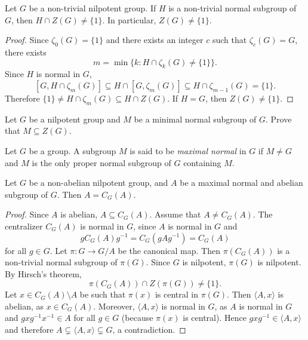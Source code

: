 \begin{theorem}[Hirsch]
\label{thm:Hirsch}
Let $G$ be a non-trivial nilpotent group. If $H$ is a non-trivial normal subgroup of $G$, 
then $H\cap Z(G)\ne\{1\}$. In particular, $Z(G)\ne\{1\}$. 
\end{theorem}

\begin{proof}
Since $\zeta_0(G)=\{1\}$ and there exists an integer $c$ such that $\zeta_c(G)=G$, 
there exists 
\[
m=\min\{k:H\cap\zeta_k(G)\ne\{1\}\}.
\]
Since $H$ is normal in $G$, 
\[
[G,H\cap\zeta_m(G)]\subseteq H\cap[G,\zeta_m(G)]\subseteq H\cap\zeta_{m-1}(G)=\{1\}.
\]
Therefore $\{1\}\ne H\cap\zeta_m(G)\subseteq H\cap Z(G)$. If $H=G$, then $Z(G)\ne\{1\}$. 
\end{proof}

\begin{exercise}
\label{xca:nilpotent_minimalnormal}
Let $G$ be a nilpotent group and $M$ be a minimal normal subgroup of $G$. Prove 
that $M\subseteq Z(G)$.
\end{exercise}


\begin{definition}
    Let $G$ be a group. A subgroup $M$ is said to be \emph{maximal normal} in $G$
    if $M\ne G$ and $M$ is the only proper normal subgroup of $G$ containing $M$. 
\end{definition}

\begin{corollary}
Let $G$ be a non-abelian nilpotent group, and $A$ be a maximal normal and abelian 
subgroup of $G$. Then $A=C_G(A)$.
\end{corollary}

\begin{proof}
Since $A$ is abelian, $A\subseteq C_G(A)$. Assume that $A\ne C_G(A)$.
The centralizer $C_G(A)$ is normal in $G$, since $A$ is normal in $G$ and  
\[
gC_G(A)g^{-1}=C_G(gAg^{-1})=C_G(A)
\]
for all $g\in G$. Let $\pi\colon G\to G/A$ be the canonical map. 
Then $\pi(C_G(A))$ is a non-trivial normal subgroup of $\pi(G)$. Since 
$G$ is nilpotent, $\pi(G)$ is nilpotent. By Hirsch's theorem, 
\[
\pi(C_G(A))\cap Z(\pi(G))\ne\{1\}.
\]
Let $x\in C_G(A)\setminus A$ be such that $\pi(x)$ is central in $\pi(G)$.  Then 
$\langle A,x\rangle$ is abelian, as $x\in C_G(A)$. Moreover,  $\langle
A,x\rangle$ is normal in $G$, as $A$ is normal in $G$ and 
$gxg^{-1}x^{-1}\in A$ for all  $g\in G$ (because $\pi(x)$ is central). Hence
	$gxg^{-1}\in \langle A,x\rangle$ and therefore $A\subsetneq \langle
	A,x\rangle\subsetneq G$, a contradiction.
\end{proof}

